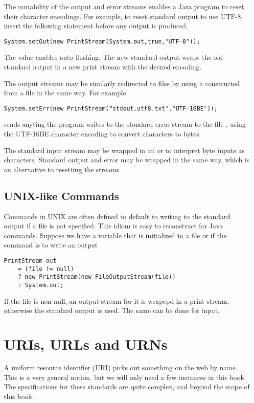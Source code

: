 The mutability of the output and error streams enables a Java program
to reset their character encodings.  For example, to reset standard
output to use UTF-8, insert the following statement before any
output is produced,
%
\begin{verbatim}
System.setOut(new PrintStream(System.out,true,"UTF-8"));
\end{verbatim}
%
The value  enables auto-flushing.  The new standard
output wraps the old standard output in a new print stream
with the desired encoding. 

The output streams may be similarly redirected to files by using a
 constructed from a file in the same way.  For
example,
%
\begin{verbatim}
System.setErr(new PrintStream("stdout.utf8.txt","UTF-16BE"));
\end{verbatim}
%
sends anyting the program writes to the standard error stream to the
file , using the UTF-16BE character encoding
to convert characters to bytes.

The standard input stream may be wrapped in an
 or  to interpret byte
inputs as characters.  Standard output and error may be wrapped in the
same way, which is an alternative to resetting the streams.

\subsection{UNIX-like Commands}

Commands in UNIX are often defined to default to writing to the
standard output if a file is not specified.  This idiom is easy to
reconstruct for Java commands.  Suppose we have a variable 
that is initialized to a file or  if the command is to
write an output
%
\begin{verbatim}
PrintStream out 
    = (file != null)
    ? new PrintStream(new FileOutputStream(file))
    : System.out;
\end{verbatim}
%
If the file is non-null, an output stream for it is wrapepd
in a print stream, otherwise the standard output is used.
The same can be done for input.

\section{URIs, URLs and URNs}\label{section:uri-url-urn}

A uniform resource identifier (URI) picks out something on the web by
name.  This is a very general notion, but we will only need a few
instances in this book.  The specifications for these standards are
quite complex, and beyond the scope of this book.  

